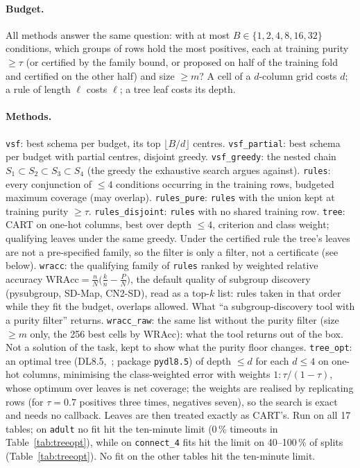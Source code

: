 \documentclass[11pt]{article}
\begin{document}
\paragraph{Budget.} All methods answer the same question: with at most $B\in\{1,2,4,8,16,32\}$ conditions, which groups of rows hold the most positives, each at training purity $\ge\tau$ (or certified by the family bound, or proposed on half of the training fold and certified on the other half) and size $\ge m$? A cell of a $d$-column grid costs $d$; a rule of length $\ell$ costs $\ell$; a tree leaf costs its depth.

\paragraph{Methods.}
\texttt{vsf}: best schema per budget, its top $\lfloor B/d\rfloor$ centres.
\texttt{vsf\_partial}: best schema per budget with partial centres, disjoint greedy.
\texttt{vsf\_greedy}: the nested chain $S_1\subset S_2\subset S_3\subset S_4$ (the greedy the exhaustive search argues against).
\texttt{rules}: every conjunction of $\le 4$ conditions occurring in the training rows, budgeted maximum coverage (may overlap).
\texttt{rules\_pure}: \texttt{rules} with the union kept at training purity $\ge\tau$.
\texttt{rules\_disjoint}: \texttt{rules} with no shared training row.
\texttt{tree}: CART on one-hot columns, best over depth $\le 4$, criterion and class weight; qualifying leaves under the same greedy. Under the certified rule the tree's leaves are not a pre-specified family, so the filter is only a filter, not a certificate (see below).
\texttt{wracc}: the qualifying family of \texttt{rules} ranked by weighted relative accuracy $\mathrm{WRAcc}=\frac{n}{N}\big(\frac{k}{n}-\frac{P}{N}\big)$, the default quality of subgroup discovery (pysubgroup, SD-Map, CN2-SD), read as a top-$k$ list: rules taken in that order while they fit the budget, overlaps allowed. What ``a subgroup-discovery tool with a purity filter'' returns.
\texttt{wracc\_raw}: the same list without the purity filter (size $\ge m$ only, the 256 best cells by WRAcc): what the tool returns out of the box. Not a solution of the task, kept to show what the purity floor changes.
\texttt{tree\_opt}: an optimal tree (DL8.5,~\citealp{aglin2020}; package \texttt{pydl8.5}) of depth $\le d$ for each $d\le4$ on one-hot columns, minimising the class-weighted error with weights $1:\tau/(1-\tau)$, whose optimum over leaves is net coverage; the weights are realised by replicating rows (for $\tau=0.7$ positives three times, negatives seven), so the search is exact and needs no callback. Leaves are then treated exactly as CART's. Run on all 17 tables; on \texttt{adult} no fit hit the ten-minute limit (0\,\% timeouts in Table~\ref{tab:treeopt}), while on \texttt{connect\_4} fits hit the limit on 40--100\,\% of splits (Table~\ref{tab:treeopt}). No fit on the other tables hit the ten-minute limit.
\end{document}

